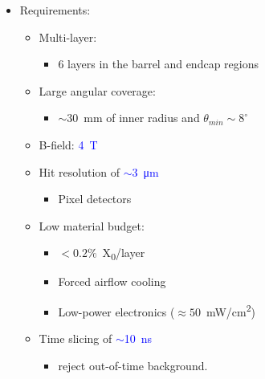 \begin{frame}
\begin{columns}
    \begin{itemize}
    \item Requirements:
      \begin{itemize}
      \item Multi-layer: 
        \begin{itemize}
          \item 6 layers in the barrel and endcap regions
          \end{itemize}
      \item Large angular coverage: 
        \begin{itemize}
        \item $\sim30$~mm of inner radius and
          $\theta_{min}\sim8^{\circ}$
        \end{itemize}
      \item B-field: \textcolor{Blue}{4~T}
      \item Hit resolution of
        \textcolor{Blue}{$\sim$\SI{3}{\micro\meter}}
        \begin{itemize}
        \item Pixel detectors
        \end{itemize}
      \item Low material budget: 
        \begin{itemize}
        \item $<0.2\%$~X\textsubscript{0}/layer
        \item Forced airflow cooling
        \item Low-power electronics
          ($\approx 50$~mW/cm\textsuperscript{2})
        \end{itemize}
      \item Time slicing of
        \textcolor{Blue}{$\sim$\SI{10}{\nano\second}}
        \begin{itemize}
        \item reject out-of-time background.
        \end{itemize}
      \end{itemize}
    \end{itemize}

    \centering


\end{columns}
\end{frame}
